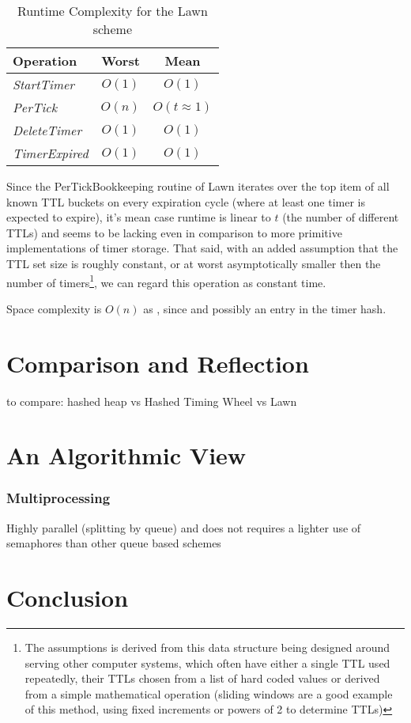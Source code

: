 \documentclass[twocolumn,a4paper]{article}
\newcommand{\advcomplexity}[9]{
\begin{table}[h!]
	\begin{center}
		\begin{tabular}{l|c|c}
			\textbf{Operation} & \textbf{Worst} & \textbf{Mean} \\
			\hline
			\textit{StartTimer} & $O(#1)$ & $O(#2)$ \\
			\textit{PerTick} & $O(#3)$ & $O(#4)$ \\
			\textit{DeleteTimer} & $O(#5)$ & $O(#6)$ \\
			\textit{TimerExpired} & $O(#7)$ & $O(#8)$ \\
		\end{tabular}
		\caption{Runtime Complexity for #9 scheme}
		\label{tab:table1}
	\end{center}
\end{table}
}
\begin{document}
\advcomplexity{1}{1}{n}{t\approx1}{1}{1}{1}{1}{the Lawn}

Since the PerTickBookkeeping routine of Lawn iterates over the top item of all known TTL buckets on every expiration cycle (where at least one timer is expected to expire), it's mean case runtime is linear to $t$ (the number of different TTLs) and seems to be lacking even in comparison to more primitive implementations of timer storage. That said, with an added assumption that the TTL set size is roughly constant, or at worst asymptotically smaller then the number of timers\footnote{The assumptions is derived from this data structure being designed around serving other computer systems, which often have either a single TTL used repeatedly, their TTLs chosen from a list of hard coded values or derived from a simple mathematical operation (sliding windows are a good example of this method, using fixed increments or powers of 2 to determine TTLs)}, we can regard this operation as constant time.



Space complexity is $O(n)$ as , since  and possibly an entry in the timer hash.

\section{Comparison and Reflection}

to compare:
hashed heap
vs
Hashed Timing Wheel
vs 
Lawn

\section{An Algorithmic View}

\subsubsection{Multiprocessing}
Highly parallel (splitting by queue) and does not requires a lighter use of semaphores  than other queue based schemes

\section{Conclusion}



\end{document}
